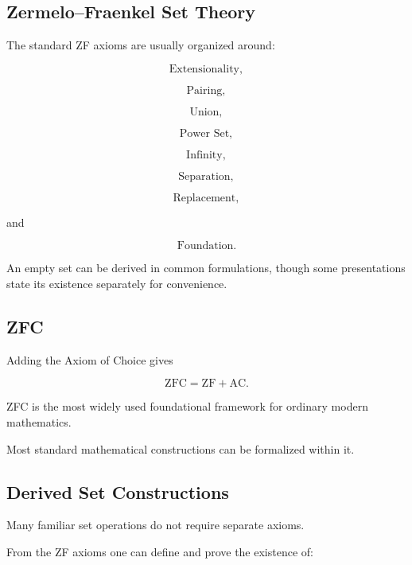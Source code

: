 \subsection{Zermelo--Fraenkel Set Theory}
\label{subsec:zf-set-theory}

The standard ZF axioms are usually organized around:

\[
\boxed{
\text{Extensionality},
}
\]

\[
\boxed{
\text{Pairing},
}
\]

\[
\boxed{
\text{Union},
}
\]

\[
\boxed{
\text{Power Set},
}
\]

\[
\boxed{
\text{Infinity},
}
\]

\[
\boxed{
\text{Separation},
}
\]

\[
\boxed{
\text{Replacement},
}
\]

and

\[
\boxed{
\text{Foundation}.
}
\]

An empty set can be derived in common formulations, though some
presentations state its existence separately for convenience.

\subsection{ZFC}
\label{subsec:zfc}

Adding the Axiom of Choice gives

\[
\boxed{
\mathrm{ZFC}
=
\mathrm{ZF}
+
\mathrm{AC}.
}
\]

ZFC is the most widely used foundational framework for ordinary modern
mathematics.

Most standard mathematical constructions can be formalized within it.

\subsection{Derived Set Constructions}
\label{subsec:derived-set-constructions}

Many familiar set operations do not require separate axioms.

From the ZF axioms one can define and prove the existence of:

